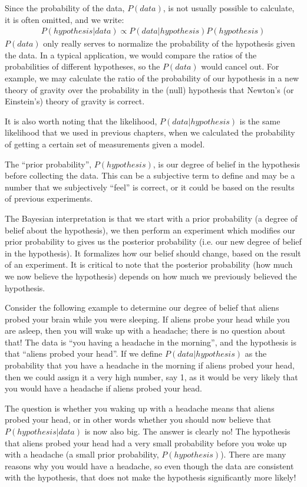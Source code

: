 Since the probability of the data, $P(data)$, is not usually possible to calculate, it is often omitted, and we write:
\begin{align*}
P(hypothesis|data) \propto P(data | hypothesis)P(hypothesis)
\end{align*}
$P(data)$ only really serves to normalize the probability of the hypothesis given the data. In a typical application, we would compare the ratios of the probabilities of different hypotheses, so the $P(data)$ would cancel out. For example, we may calculate the ratio of the probability of our hypothesis in a new theory of gravity over the probability in the (null) hypothesis that Newton's (or Einstein's) theory of gravity is correct.

It is also worth noting that the likelihood, $P(data|hypothesis)$ is the same likelihood that we used in previous chapters, when we calculated the probability of getting a certain set of measurements given a model. 

The ``prior probability'', $P(hypothesis)$, is our degree of belief in the hypothesis before collecting the data. This can be a subjective term to define and may be a number that we subjectively ``feel'' is correct, or it could be based on the results of previous experiments. 

The Bayesian interpretation is that we start with a prior probability (a degree of belief about the hypothesis), we then perform an experiment which modifies our prior probability to gives us the posterior probability (i.e. our new degree of belief in the hypothesis). It formalizes how our belief should change, based on the result of an experiment. It is critical to note that the posterior probability (how much we now believe the hypothesis) depends on how much we previously believed the hypothesis.

Consider the following example to determine our degree of belief that aliens probed your brain while you were sleeping. If aliens probe your head while you are asleep, then you will wake up with a headache; there is no question about that! The data is ``you having a headache in the morning'', and the hypothesis is that ``aliens probed your head''. If we define $P(data|hypothesis)$ as the probability that you have a headache in the morning if aliens probed your head, then we could assign it a very high number, say 1, as it would be very likely that you would have a headache if aliens probed your head.

The question is whether you waking up with a headache means that aliens probed your head, or in other words whether you should now believe that $P(hypothesis|data)$ is now also big. The answer is clearly no! The hypothesis that aliens probed your head had a very small probability before you woke up with a headache (a small prior probability, $P(hypothesis)$). There are many reasons why you would have a headache, so even though the data are consistent with the hypothesis, that does not make the hypothesis significantly more likely!

